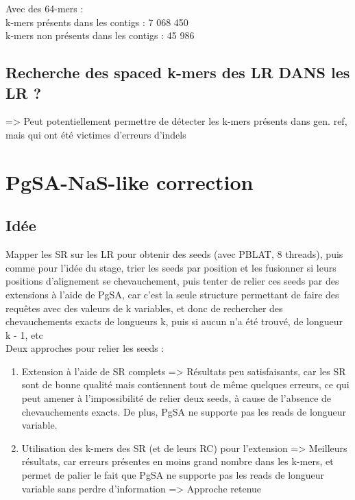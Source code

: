 \documentclass[12pt]{article}
\begin{document}
Avec des 64-mers : \\

k-mers présents dans les contigs : 7 068 450 \\
k-mers non présents dans les contigs : 45 986 \\

\subsection{Recherche des spaced k-mers des LR DANS les LR ?}

=> Peut potentiellement permettre de détecter les k-mers présents dans gen. ref, mais qui ont été victimes d'erreurs d'indels

\newpage

\section{PgSA-NaS-like correction}

\subsection{Idée}

Mapper les SR sur les LR pour obtenir des seeds (avec PBLAT, 8 threads), puis comme pour l'idée du stage, trier les seeds par position et les fusionner si leurs positions d'alignement se chevauchement, puis tenter de relier ces seeds par des extensions à l'aide de PgSA, car c'est la seule structure permettant de faire des requêtes avec des valeurs de k variables, et donc de rechercher des chevauchements exacts de longueurs k, puis si aucun n'a été trouvé, de longueur k - 1, etc \\

Deux approches pour relier les seeds : \

\begin{enumerate}
	\item Extension à l'aide de SR complets => Résultats peu satisfaisants, car les SR sont de bonne qualité mais contiennent tout de même quelques erreurs,
		  ce qui peut amener à l'impossibilité de relier deux seeds, à cause de l'absence de chevauchements exacts. De plus, PgSA ne supporte pas les reads
		  de longueur variable.
	
	\item Utilisation des k-mers des SR (et de leurs RC) pour l'extension => Meilleurs résultats, car erreurs présentes en moins grand nombre dans les 
		  k-mers, et permet de palier le fait que PgSA ne supporte pas les reads de longueur variable sans perdre d'information => Approche retenue
\end{enumerate}
\end{document}
